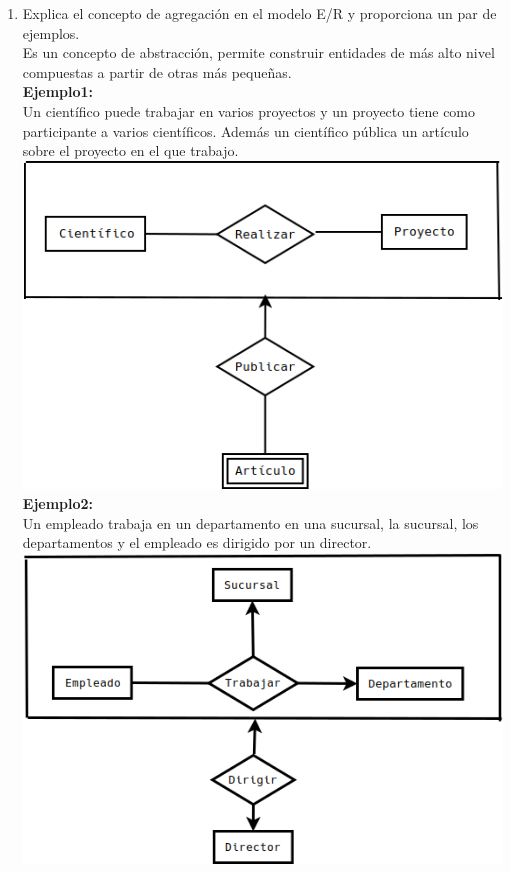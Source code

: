 \documentclass[a4paper, 12pt]{report}
\begin{document}
	\begin{enumerate}
		\item Explica el concepto de agregación en el modelo E/R y
		 proporciona un par de ejemplos.\\

		 Es un concepto de abstracción, permite construir entidades
		 de más alto nivel compuestas a partir de otras más pequeñas.\\
		\textbf{Ejemplo1:}\\
		Un científico puede trabajar en varios proyectos y un proyecto
		tiene como participante a varios científicos. Además un
		científico pública un artículo sobre el proyecto en el que
		trabajo.\\
		\includegraphics[scale= 0.5]{Ejemplo1}\\
		\textbf{Ejemplo2:}\\
		Un empleado trabaja en un departamento en una sucursal, la
		sucursal, los departamentos y el empleado es dirigido por un
		director.\\
		\includegraphics[scale= 0.5]{Ejemplo2}

\end{enumerate}
\end{document}
